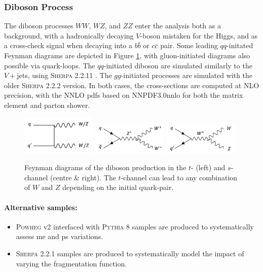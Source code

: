 \subsubsection{Diboson Process}
The diboson processes $WW$, $WZ$, and $ZZ$ enter the analysis both as a background, with a hadronically decaying $V$-boson mistaken for the Higgs, and as a cross-check signal when decaying into a $b\bar{b}$ or $c\bar{c}$ pair. Some leading $qq$-initated Feynman diagrams are depicted in Figure \ref{fig:feyndiV}, with gluon-initiated diagrams also possible via quark-loops. The $qq$-initiated diboson are simulated similarly to the $V+$jets, using \textsc{Sherpa} 2.2.11 \cite{10.21468/SciPostPhys.7.3.034}. The $gg$-initiated processes are simulated with the older \textsc{Sherpa} 2.2.2 version. In both cases, the cross-sections are computed at NLO precision, with the NNLO \glspl{pdf} based on NNPDF3.0nnlo \cite{PDFLHCrun2} for both the matrix element and parton shower.
\begin{figure}[h!]
  \center
  \includegraphics[width=0.32\textwidth]{Images/VH/Feynman/diboson.png}
  \includegraphics[width=0.32\textwidth]{Images/VH/Feynman/diW.png}
  \includegraphics[width=0.32\textwidth]{Images/VH/Feynman/diWZ.png}
  \caption{Feynman diagrams of the diboson production in the $t$- (left) and $s$-channel (centre \& right). The $t$-channel can lead to any combination of $W$ and $Z$ depending on the initial quark-pair.}
  \label{fig:feyndiV}
\end{figure}

\paragraph{Alternative samples:}
\begin{itemize}
  \item \textsc{Powheg} v2 interfaced with \textsc{Pythia} 8 samples are produced to systematically assess \gls{me} and \gls{ps} variations. 
  \item \textsc{Sherpa} 2.2.1 samples are produced to systematically model the impact of varying the fragmentation function. %
\end{itemize}

